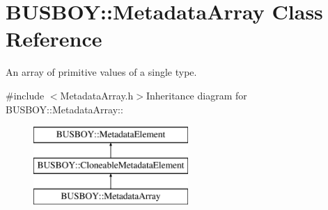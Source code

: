 \hypertarget{classBUSBOY_1_1MetadataArray}{
\section{BUSBOY::MetadataArray Class Reference}
\label{classBUSBOY_1_1MetadataArray}
}


An array of primitive values of a single type.  


{\ttfamily \#include $<$MetadataArray.h$>$}Inheritance diagram for BUSBOY::MetadataArray::\begin{figure}[H]
\begin{center}
\leavevmode
\includegraphics[height=3cm]{classBUSBOY_1_1MetadataArray}
\end{center}
\end{figure}
